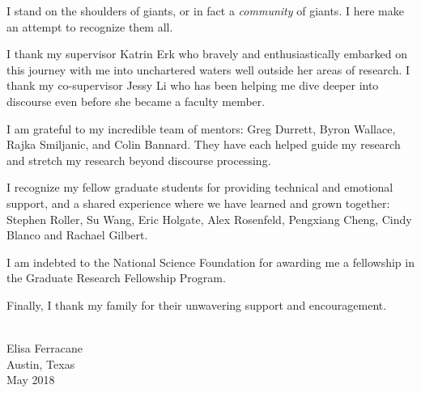 I stand on the shoulders of giants, or in fact a \emph{community} of giants. I here make an attempt to recognize them all. 

I thank my supervisor Katrin Erk who bravely and enthusiastically embarked on this journey with me into unchartered waters well outside her areas of research. I thank my co-supervisor Jessy Li who has been helping me dive deeper into discourse even before she became a faculty member. 

I am grateful to my incredible team of mentors: Greg Durrett, Byron Wallace, Rajka Smiljanic, and Colin Bannard. They have each helped guide my research and stretch my research beyond discourse processing. 

I recognize my fellow graduate students for providing technical and emotional support, and a shared experience where we have learned and grown together: Stephen Roller, Su Wang, Eric Holgate, Alex Rosenfeld, Pengxiang Cheng, Cindy Blanco and Rachael Gilbert.

I am indebted to the National Science Foundation for awarding me a fellowship in the Graduate Research Fellowship Program.

Finally, I thank my family for their unwavering support and encouragement.

\begin{flushright}
~\\
Elisa Ferracane\\
Austin, Texas\\
May 2018
\end{flushright}
